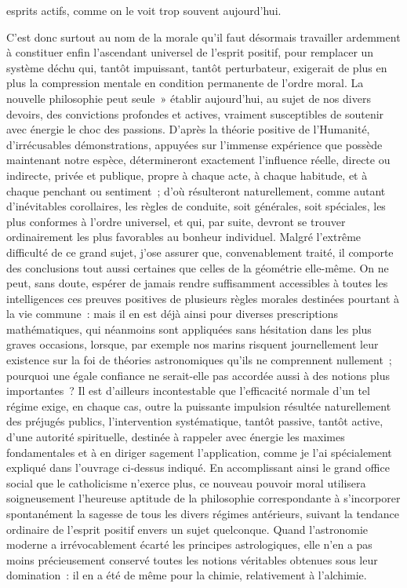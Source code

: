 \documentclass[french,twoside]{book} %
\begin{document}
esprits actifs, comme on le voit trop souvent aujourd’hui.\par
C’est donc surtout au nom de la morale qu’il faut désormais travailler ardemment à constituer enfin l’ascendant universel de l’esprit positif, pour remplacer un système déchu qui, tantôt impuissant, tantôt perturbateur, exigerait de plus en plus la compression mentale en condition permanente de l’ordre moral. La nouvelle philosophie peut seule » établir aujourd’hui, au sujet de nos divers devoirs, des convictions profondes et actives, vraiment susceptibles de soutenir avec énergie le choc des passions. D’après la théorie positive de l’Humanité, d’irrécusables démonstrations, appuyées sur l’immense expérience que possède maintenant notre espèce, détermineront exactement l’influence réelle, directe ou indirecte, privée et publique, propre à chaque acte, à chaque habitude, et à chaque penchant ou sentiment ; d’où résulteront naturellement, comme autant d’inévitables corollaires, les règles de conduite, soit générales, soit spéciales, les plus conformes à l’ordre universel, et qui, par suite, devront se trouver ordinairement les plus favorables au bonheur individuel. Malgré l’extrême difficulté de ce grand sujet, j’ose assurer que, convenablement traité, il comporte des conclusions tout aussi certaines que celles de la géométrie elle-même. On ne peut, sans doute, espérer de jamais rendre suffisamment accessibles à toutes les intelligences ces preuves positives de plusieurs règles morales destinées pourtant à la vie commune : mais il en est déjà ainsi pour diverses prescriptions mathématiques, qui néanmoins sont appliquées sans hésitation dans les plus graves occasions, lorsque, par exemple nos marins risquent journellement leur existence sur la foi de théories astronomiques qu’ils ne comprennent nullement ; pourquoi une égale confiance ne serait-elle pas accordée aussi à des notions plus importantes ? Il est d’ailleurs incontestable que l’efficacité normale d’un tel régime exige, en chaque cas, outre la puissante impulsion résultée naturellement des préjugés publics, l’intervention systématique, tantôt passive, tantôt active, d’une autorité spirituelle, destinée à rappeler avec énergie les maximes fondamentales et à en diriger sagement l’application, comme je l’ai spécialement expliqué dans l’ouvrage ci-dessus indiqué. En accomplissant ainsi le grand office social que le catholicisme n’exerce plus, ce nouveau pouvoir moral utilisera soigneusement l’heureuse aptitude de la philosophie correspondante à s’incorporer spontanément la sagesse de tous les divers régimes antérieurs, suivant la tendance ordinaire de l’esprit positif envers un sujet quelconque. Quand l’astronomie moderne a irrévocablement écarté les principes astrologiques, elle n’en a pas moins précieusement conservé toutes les notions véritables obtenues sous leur domination : il en a été de même pour la chimie, relativement à l’alchimie.\par
\end{document}
